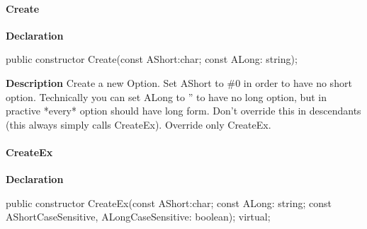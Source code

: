 \documentclass{report}
\newif\ifpdf
\begin{document}
\paragraph*{Create}\hspace*{\fill}

\label{PasDoc_OptionParser.TOption-Create}
\begin{list}{}{
\setlength{\itemindent}{0cm}
\setlength{\listparindent}{0cm}
\setlength{\leftmargin}{\evensidemargin}
\addtolength{\leftmargin}{\tmplength}
\settowidth{\labelsep}{X}
\addtolength{\leftmargin}{\labelsep}
\setlength{\labelwidth}{\tmplength}
}
\item[\textbf{Declaration}\hfill]
\ifpdf
\begin{flushleft}
\fi
\begin{ttfamily}
public constructor Create(const AShort:char; const ALong: string);\end{ttfamily}

\ifpdf
\end{flushleft}
\fi

\par
\item[\textbf{Description}]
Create a new Option. Set AShort to {\#}0 in order to have no short option. Technically you can set ALong to '' to have no long option, but in practive *every* option should have long form. Don't override this in descendants (this always simply calls CreateEx). Override only CreateEx.

\end{list}
\paragraph*{CreateEx}\hspace*{\fill}

\label{PasDoc_OptionParser.TOption-CreateEx}
\begin{list}{}{
\setlength{\itemindent}{0cm}
\setlength{\listparindent}{0cm}
\setlength{\leftmargin}{\evensidemargin}
\addtolength{\leftmargin}{\tmplength}
\settowidth{\labelsep}{X}
\addtolength{\leftmargin}{\labelsep}
\setlength{\labelwidth}{\tmplength}
}
\item[\textbf{Declaration}\hfill]
\ifpdf
\begin{flushleft}
\fi
\begin{ttfamily}
public constructor CreateEx(const AShort:char; const ALong: string; const AShortCaseSensitive, ALongCaseSensitive: boolean); virtual;\end{ttfamily}

\ifpdf
\end{flushleft}
\fi

\end{list}
\end{document}
